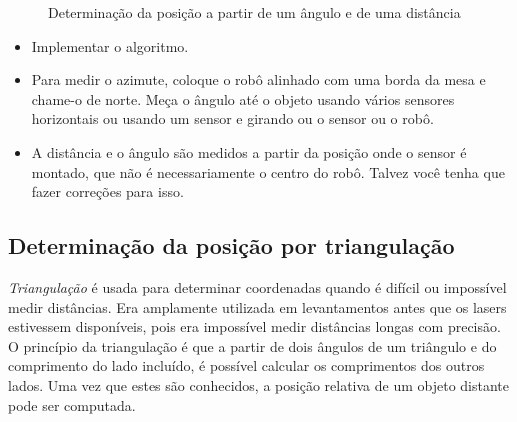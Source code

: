 \begin{figure}
\begin{center}
\caption{Determinação da posição a partir de um ângulo e de uma distância}\label{fig.angle-distance}
\end{center}
\end{figure}

\begin{framed}
\begin{itemize}
\item Implementar o algoritmo.
\item Para medir o azimute, coloque o robô alinhado com uma borda da mesa e chame-o de norte. Meça o ângulo até o objeto usando vários sensores horizontais ou usando um sensor e girando ou o sensor ou o robô.
\item A distância e o ângulo são medidos a partir da posição onde o sensor é montado, que não é necessariamente o centro do robô. Talvez você tenha que fazer correções para isso.
\end{itemize}
\end{framed}

\subsection{Determinação da posição por triangulação}

\emph{Triangulação} é usada para determinar coordenadas quando é difícil ou impossível medir distâncias. Era amplamente utilizada em levantamentos antes que os lasers estivessem disponíveis, pois era impossível medir distâncias longas com precisão. O princípio da triangulação é que a partir de dois ângulos de um triângulo e do comprimento do lado incluído, é possível calcular os comprimentos dos outros lados. Uma vez que estes são conhecidos, a posição relativa de um objeto distante pode ser computada.

